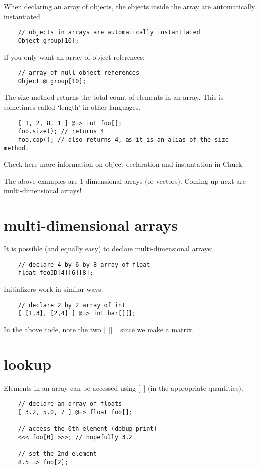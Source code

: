 When declaring an array of objects, the objects inside the array are automatically instantiated.
\begin{verbatim}
    // objects in arrays are automatically instantiated
    Object group[10];
\end{verbatim}

If you only want an array of object references:
\begin{verbatim}
    // array of null object references
    Object @ group[10];
\end{verbatim}

The size method returns the total count of elements in an array. This is sometimes called `length' in other languages.
\begin{verbatim}
    [ 1, 2, 8, 1 ] @=> int foo[];
    foo.size(); // returns 4
    foo.cap(); // also returns 4, as it is an alias of the size method.
\end{verbatim}

Check here more information on object declaration and instantation in Chuck.

The above examples are 1-dimensional arrays (or vectors). Coming up next are multi-dimensional arrays!
 

\section{multi-dimensional arrays}

It is possible (and equally easy) to declare multi-dimensional arrays:
\begin{verbatim}
    // declare 4 by 6 by 8 array of float
    float foo3D[4][6][8];
\end{verbatim}

Initializers work in similar ways:
\begin{verbatim}
    // declare 2 by 2 array of int
    [ [1,3], [2,4] ] @=> int bar[][];
\end{verbatim}
 In the above code, note the two [~][~] since we make a matrix.
 

\section{lookup}

Elements in an array can be accessed using [~] (in the appropriate quantities).
\begin{verbatim}
    // declare an array of floats
    [ 3.2, 5.0, 7 ] @=> float foo[];

    // access the 0th element (debug print)
    <<< foo[0] >>>; // hopefully 3.2

    // set the 2nd element
    8.5 => foo[2];
\end{verbatim}

